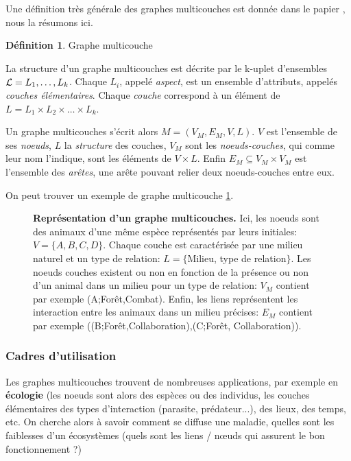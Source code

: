 \documentclass[11pt,a4paper]{article}
\theoremstyle{definition}
\newtheorem{defn}{Définition}
\theoremstyle{remark}
\theoremstyle{remark}
\begin{document}
 Une définition très générale des graphes multicouches est donnée dans le papier \cite{mlkiv}, nous la résumons ici.
 
 \begin{defn}{Graphe multicouche}
 
 La structure d'un graphe multicouches est décrite par le k-uplet d'ensembles ${\cal L} = L_1, \dots , L_k$. Chaque $L_i$, appelé {\em aspect}, est un ensemble d'attributs, appelés {\em couches élémentaires}. Chaque {\em couche} correspond à un élément de $L=L_1\times L_2 \times \dots \times L_k$.
 
 Un graphe multicouches s'écrit alors $M = (V_M, E_M, V, L)$. $V$ est l'ensemble de ses {\em noeuds}, $L$ la {\em structure} des couches, $V_M$ sont les {\em noeuds-couches}, qui comme leur nom l'indique, sont les éléments de $V\times L$. Enfin $E_M \subseteq V_M \times V_M $ est l'ensemble des {\em arêtes}, une arête pouvant relier deux noeuds-couches entre eux. 

	\end{defn}
 
 On peut trouver un exemple de graphe multicouche \cref{exmulti}.

\begin{figure}[h]
	\centering
	
	\caption{\textbf{Représentation d'un graphe multicouches.} Ici, les noeuds sont des animaux d'une même espèce représentés par leurs initiales: $V = \{A ,B,C,D \}$. Chaque couche est caractérisée par une milieu naturel et un type de relation: $L = \{$Milieu, type de relation$\}$. Les noeuds couches existent ou non en fonction de la présence ou non d'un animal dans un milieu pour un type de relation: $V_M$ contient par exemple (A;Forêt,Combat). Enfin, les liens représentent les interaction entre les animaux dans un milieu précises: $E_M$ contient par exemple ((B;Forêt,Collaboration),(C;Forêt, Collaboration)).}
	\label{exmulti}
\end{figure}

\subsubsection{Cadres d'utilisation}


Les graphes multicouches trouvent de nombreuses applications, par exemple en \textbf{écologie} \cite{ecolo} (les noeuds sont alors des espèces ou des individus, les couches élémentaires des types d'interaction (parasite, prédateur...), des lieux, des temps, etc. On cherche alors à savoir comment se diffuse une maladie, quelles sont les faiblesses d'un écosystèmes (quels sont les liens / nœuds qui assurent le bon fonctionnement ?)
\end{document}
